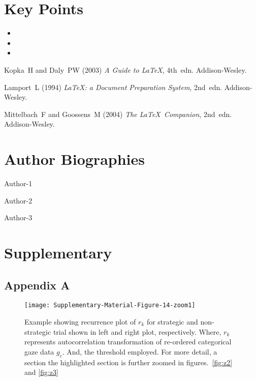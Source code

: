 \documentclass[Afour,sageh,times] {sagej}
\begin{document}
	\lipsum[1-1]
	
	\section{Key Points}
	\begin{itemize}
		\item \lipsum[1][1]\par
		\item \lipsum[1][1]\par
		\item \lipsum[1][1]\par
	\end{itemize}
	
	
	\begin{acks}
		\lipsum[1-1]
	\end{acks}
	
	\begin{thebibliography}{99}
		Kopka~H and Daly~PW (2003) \textit{A Guide to \LaTeX}, 4th~edn.
		Addison-Wesley.
		
		Lamport~L (1994) \textit{\LaTeX: a Document Preparation System},
		2nd~edn. Addison-Wesley.
		
		Mittelbach~F and Goossens~M (2004) \textit{The \LaTeX\ Companion},
		2nd~edn. Addison-Wesley.
		
	\end{thebibliography}
	\newpage

	\section{Author Biographies}
	
	Author-1
	
	\noindent Author-2
	
	\noindent Author-3
	
	\newpage
	\setcounter{page}{1}
	\section{Supplementary}\label{Supplementary}
	\subsection{Appendix A}
	\lipsum[1-1]
	
	\begin{figure*}[!hb]
			\centering
			\texttt{[image: Supplementary-Material-Figure-14-zoom1]}
			\caption{Example showing recurrence plot of $r_k$ for strategic and non-strategic trial shown in left and right plot, respectively. Where, $r_k$ represents autocorrelation transformation of re-ordered categorical gaze data $g_c$. And, the threshold employed. For more detail, a section the highlighted section is further zoomed in figures.~\ref{fig:z2} and \ref{fig:z3}}
			\label{fig:z1}
	\end{figure*}
	
\end{document}
